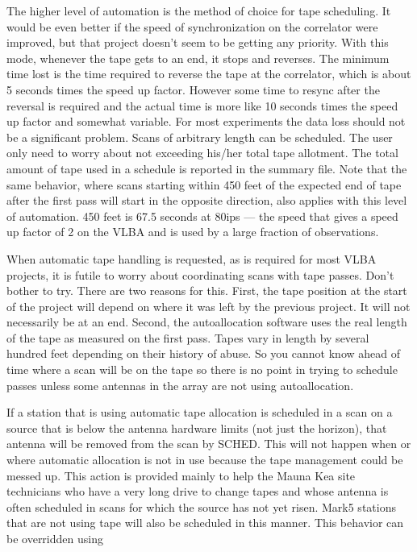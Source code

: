 \documentclass{report}
\newcommand{\sched}{{\sc SCHED}}
\begin{document}
The higher level of automation is the method of choice for tape
scheduling.  It would be even better if the speed of synchronization
on the correlator were improved, but that project doesn't seem to be
getting any priority.  With this mode, whenever the tape gets to an
end, it stops and reverses.  The minimum time lost is the time
required to reverse the tape at the correlator, which is about 5
seconds times the speed up factor.  However some time to resync after
the reversal is required and the actual time is more like 10 seconds
times the speed up factor and somewhat variable.  For most experiments
the data loss should not be a significant problem.  Scans of arbitrary
length can be scheduled.  The user only need to worry about not
exceeding his/her total tape allotment.  The total amount of tape used
in a schedule is reported in the summary file.  Note that the same
behavior, where scans starting within 450 feet of the expected end of
tape after the first pass will start in the opposite direction, also
applies with this level of automation.  450 feet is 67.5 seconds at
80ips --- the speed that gives a speed up factor of 2 on the VLBA and
is used by a large fraction of observations.

When automatic tape handling is requested, as is required for most
VLBA projects, it is futile to worry about coordinating scans with
tape passes.  Don't bother to try.  There are two reasons for this.
First, the tape position at the start of the project will depend on
where it was left by the previous project.  It will not necessarily be
at an end.  Second, the autoallocation software uses the real length
of the tape as measured on the first pass.  Tapes vary in length by
several hundred feet depending on their history of abuse.  So you
cannot know ahead of time where a scan will be on the tape so there
is no point in trying to schedule passes unless some antennas in the
array are not using autoallocation.

If a station that is using automatic tape allocation is scheduled in a
scan on a source that is below the antenna hardware limits (not just
the horizon), that antenna will be removed from the scan by \sched.
This will not happen when or where automatic allocation is not in
use because the tape management could be messed up.  This action is
provided mainly to help the Mauna Kea site technicians who have a
very long drive to change tapes and whose antenna is often scheduled
in scans for which the source has not yet risen.  Mark5 stations
that are not using tape will also be scheduled in this manner.  This
behavior can be overridden using 
\end{document}
